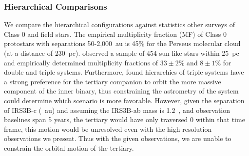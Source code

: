 \documentclass[twocolumn, 12pt, trackchanges]{aastex63}
\begin{document}
\subsubsection{Hierarchical Comparisons}\label{sec:hierarchy}
We compare the hierarchical configurations against statistics other surveys of Class 0 and field stars. The empirical multiplicity fraction (MF) of Class 0 protostars with separations 50-2,000~au is 45\% \citep{2016ApJ...818...73T}\space for the Perseus molecular cloud (at a distance of 230~pc). \citet{2010ApJS..190....1R} observed a sample of 454 sun-like stars within 25~pc and empirically determined multiplicity fractions of $33\pm2$\% and $8\pm1$\% for double and triple systems.   Furthermore, \citet{2010ApJS..190....1R} found hierarchies of triple systems have a strong preference for the tertiary companion to orbit the more massive component of the inner binary, thus constraining the astrometry of the system could determine which scenario is more favorable. However, given the separation of IRS3B-c (~au) and assuming the IRS3B-ab mass is 1.2~\solm, and observation baselines span 5 years, the tertiary would have only traversed 0 within that time frame, this motion would be unresolved even with the high resolution observations we present. Thus with the given observations, we are unable to constrain the orbital motion of the tertiary.


\end{document}
